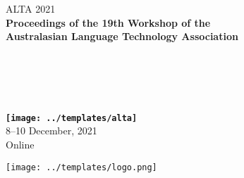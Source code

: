 \documentclass[a4paper,11pt,oneside]{book}
\begin{document}
\thispagestyle{empty}

\begin{center}
  \LARGE ALTA 2021 \\
  \vspace*{55mm}
    {\bf
    \LARGE
   Proceedings of the 19th Workshop of the \\ Australasian Language Technology Association\\
    \hspace*{1cm}\\ \hspace*{1cm} \\
    \hspace*{1cm} \\ \hspace*{1cm}\\
    \hspace*{1cm}\\
    \vspace{1cm}
	\texttt{[image: ../templates/alta]}
    \LARGE
    \vspace{1cm}
    \hspace*{1cm}} \\ %
    \vspace{10mm}
    \LARGE
    8--10 December, 2021\\
    Online
  \end{center}

\clearpage

\thispagestyle{empty}

%
\texttt{[image: ../templates/logo.png]}
\end{document}
